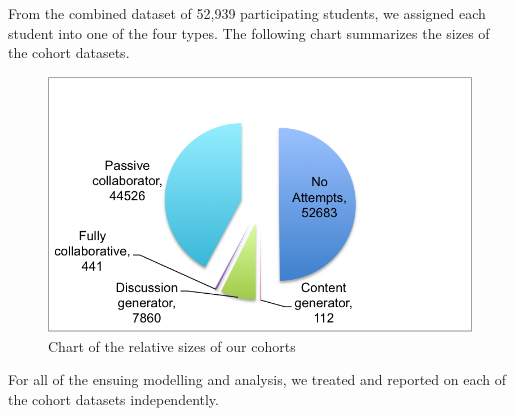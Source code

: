 From the combined dataset of 52,939 participating students, we assigned each student into one of the four types. The following chart summarizes the sizes of the cohort datasets.

\begin{figure}[!ht]
  \caption{Chart of the relative sizes of our cohorts}\label{fig:cohort_split}
  \centering
    \includegraphics[width=1.0\textwidth]{figures/cohort_split.png}
\end{figure}

For all of the ensuing modelling and analysis, we treated and reported on each of the cohort datasets independently.
